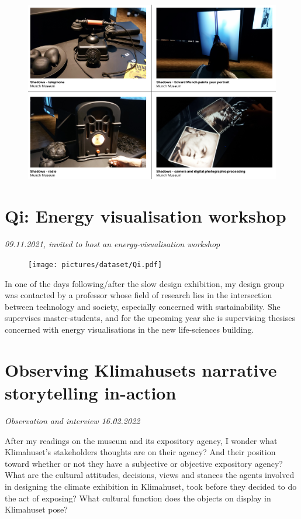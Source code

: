 \begin{figure}[H]
\includegraphics[width=12cm]{pictures/dataset/munch_1.png}
\centering 
\end{figure}


\section{Qi: Energy visualisation workshop}
\emph{09.11.2021, invited to host an energy-visualisation workshop}
\begin{figure}[H]
\texttt{[image: pictures/dataset/Qi.pdf]}
\centering 
\end{figure}

In one of the days following/after the slow design exhibition, my design group was contacted by a professor whose field of research lies in the intersection between technology and society, especially concerned with sustainability. She supervises master-students, and for the upcoming year she is supervising thesises concerned with energy visualisations in the new life-sciences building.



\section{Observing Klimahusets narrative storytelling in-action}
\par
\emph{Observation and interview 16.02.2022}
\par

After my readings on the museum and its expository agency, I wonder what Klimahuset’s stakeholders thoughts are on their agency? And their position toward whether or not they have a subjective or objective expository agency? What are the cultural attitudes, decisions, views and stances the agents involved in designing the climate exhibition in Klimahuset, took before they decided to do the act of exposing? What cultural function does the objects on display in Klimahuset pose? 

